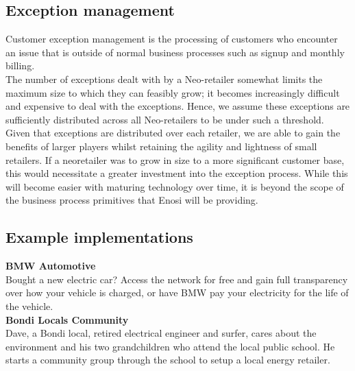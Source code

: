 \documentclass{article}
\theoremstyle{definition}
\theoremstyle{plain} %
\begin{document}
\subsection{Exception management}

\noindent Customer exception management is the processing of customers who encounter an issue that is outside of normal business processes such as signup and monthly billing.\\

\noindent The number of exceptions dealt with by a Neo-retailer somewhat limits the maximum size to which they can feasibly grow; it becomes increasingly difficult and expensive to deal with the exceptions. Hence, we assume these exceptions are sufficiently distributed across all Neo-retailers to be under such a threshold. \\

\noindent Given that exceptions are distributed over each retailer, we are able to gain the benefits of larger players whilst retaining the agility and lightness of small retailers. If a neoretailer was to grow in size to a more significant customer base, this would necessitate a greater investment into the exception process. While this will become easier with maturing technology over time, it is beyond the scope of the business process primitives that Enosi will be providing.

\subsection{Example implementations}

\textbf{BMW Automotive}\\

\noindent Bought a new electric car? Access the network for free and gain full transparency over how your vehicle is charged, or have BMW pay your electricity for the life of the vehicle.\\

\noindent \textbf{Bondi Locals Community}\\

\noindent Dave, a Bondi local, retired electrical engineer and surfer, cares about the environment and his two grandchildren who attend the local public school. He starts a community group through the school to setup a local energy retailer. 



\end{document}
